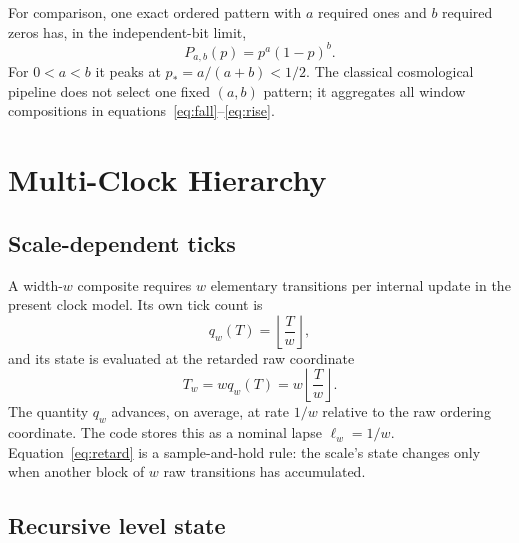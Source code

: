 \documentclass[11pt]{article}
\begin{document}
For comparison, one exact ordered pattern with $a$ required ones and $b$
required zeros has, in the independent-bit limit,
\begin{equation}
 P_{a,b}(p)=p^a(1-p)^b.
 \label{eq:pattern}
\end{equation}
For $0<a<b$ it peaks at $p_*=a/(a+b)<1/2$.  The classical cosmological
pipeline does not select one fixed $(a,b)$ pattern; it aggregates all
window compositions in equations~\eqref{eq:fall}--\eqref{eq:rise}.

\section{Multi-Clock Hierarchy}
\label{sec:multiclock}

\subsection{Scale-dependent ticks}

A width-$w$ composite requires $w$ elementary transitions per internal
update in the present clock model.  Its own tick count is
\begin{equation}
 q_w(T)=\left\lfloor\frac{T}{w}\right\rfloor,
 \label{eq:own-ticks}
\end{equation}
and its state is evaluated at the retarded raw coordinate
\begin{equation}
 T_w=wq_w(T)=w\left\lfloor\frac{T}{w}\right\rfloor.
 \label{eq:retard}
\end{equation}
The quantity $q_w$ advances, on average, at rate $1/w$ relative to the raw
ordering coordinate.  The code stores this as a nominal lapse
$\ell_w=1/w$.  Equation~\eqref{eq:retard} is a sample-and-hold rule: the
scale's state changes only when another block of $w$ raw transitions has
accumulated.

\subsection{Recursive level state}
\end{document}
